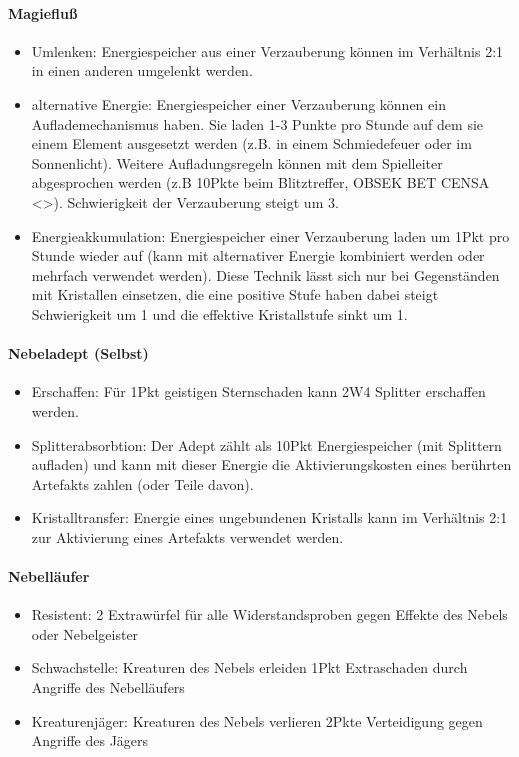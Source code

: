 \documentclass{article}
\begin{document}
\paragraph{Magiefluß}

\begin{itemize}
\item Umlenken: Energiespeicher aus einer Verzauberung können im Verhältnis 2:1 in einen anderen umgelenkt werden.
\item alternative Energie: Energiespeicher einer Verzauberung können ein Auflademechanismus haben. Sie laden 1-3 Punkte pro Stunde auf dem sie einem Element ausgesetzt werden (z.B. in einem Schmiedefeuer oder im Sonnenlicht). Weitere Aufladungsregeln können mit dem Spielleiter abgesprochen werden (z.B 10Pkte beim Blitztreffer, OBSEK BET CENSA <>). Schwierigkeit der Verzauberung steigt um 3.
\item Energieakkumulation: Energiespeicher einer Verzauberung laden um 1Pkt pro Stunde wieder auf (kann mit alternativer Energie kombiniert werden oder mehrfach verwendet werden). Diese Technik lässt sich nur bei Gegenständen mit Kristallen einsetzen, die eine positive Stufe haben dabei steigt Schwierigkeit um 1 und die effektive Kristallstufe sinkt um 1.
\end{itemize}

\paragraph{Nebeladept (Selbst)}

\begin{itemize}
\item Erschaffen: Für 1Pkt geistigen Sternschaden kann 2W4 Splitter erschaffen werden.
\item Splitterabsorbtion: Der Adept zählt als 10Pkt Energiespeicher (mit Splittern aufladen) und kann mit dieser Energie die Aktivierungskosten eines berührten Artefakts zahlen (oder Teile davon).
\item Kristalltransfer: Energie eines ungebundenen Kristalls kann im Verhältnis 2:1 zur Aktivierung eines Artefakts verwendet werden.
\end{itemize}

\paragraph{Nebelläufer}

\begin{itemize}
\item Resistent: 2 Extrawürfel für alle Widerstandsproben gegen Effekte des Nebels oder Nebelgeister
\item Schwachstelle: Kreaturen des Nebels erleiden 1Pkt Extraschaden durch Angriffe des Nebelläufers
\item Kreaturenjäger: Kreaturen des Nebels verlieren 2Pkte Verteidigung gegen Angriffe des Jägers
\end{itemize}
\end{document}
